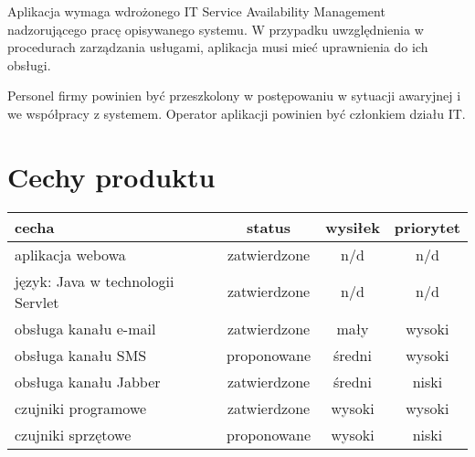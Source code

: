 \documentclass[a4paper,12pt]{article}
\begin{document}
Aplikacja wymaga wdrożonego IT Service Availability Management nadzorującego pracę opisywanego systemu.
W przypadku uwzględnienia w procedurach zarządzania usługami, aplikacja musi mieć uprawnienia do ich obsługi.

Personel firmy powinien być przeszkolony w postępowaniu w sytuacji awaryjnej i we współpracy z systemem.
Operator aplikacji powinien być członkiem działu IT.


\section{Cechy produktu}

\begin{center}
	\begin{tabular}{|l|c|c|c|}
	
		\hline
	
		\textbf{cecha} & \textbf{status} & \textbf{wysiłek} & \textbf{priorytet} \\
	
		\hline
	
		aplikacja webowa & zatwierdzone & n/d & n/d \\
	
		\hline

		język: Java w technologii Servlet & zatwierdzone & n/d & n/d \\

		\hline

		obsługa kanału e-mail & zatwierdzone & mały & wysoki \\
		
		\hline

		obsługa kanału SMS & proponowane & średni & wysoki \\
		
		\hline

		obsługa kanału Jabber & zatwierdzone & średni & niski \\
		
		\hline

		czujniki programowe & zatwierdzone & wysoki & wysoki \\
		
		\hline

		czujniki sprzętowe & proponowane & wysoki & niski \\
		
		\hline

	
	\end{tabular}
\end{center}
\end{document}
